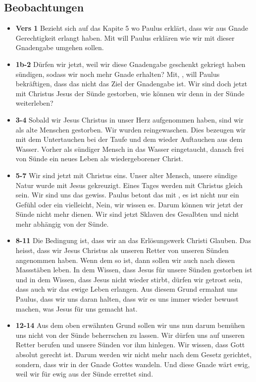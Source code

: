 \subsection{Beobachtungen}
\begin{itemize}
    \item \textbf{Vers 1} Bezieht sich auf das Kapite 5 wo Paulus erklärt, dass wir aus Gnade Gerechtigkeit erlangt haben. Mit  will Paulus erklären wie wir mit dieser Gnadengabe umgehen sollen.
    \item \textbf{1b-2} Dürfen wir jetzt, weil wir diese Gnadengabe geschenkt gekriegt haben sündigen, sodass wir noch mehr Gnade erhalten? Mit, , will Paulus bekräftigen, dass das nicht das Ziel der Gnadengabe ist. Wir sind doch jetzt mit Christus Jesus der Sünde gestorben, wie können wir denn in der Sünde weiterleben?
    \item \textbf{3-4} Sobald wir Jesus Christus in unser Herz aufgenommen haben, sind wir als alte Menschen gestorben. Wir wurden reingewaschen. Dies bezeugen wir mit dem Untertauchen bei der Taufe und dem wieder Auftauchen aus dem Wasser. Vorher als sündiger Mensch in das Wasser eingetaucht, danach frei von Sünde ein neues Leben als wiedergeborener Christ.
    \item \textbf{5-7} Wir sind jetzt mit Christus eins. Unser alter Mensch, unsere sündige Natur wurde mit Jesus gekreuzigt. Eines Tages werden mit Christus gleich sein. Wir sind uns das gewiss. Paulus betont das mit , es ist nicht nur ein Gefühl oder ein vielleicht, Nein, wir wissen es. Darum können wir jetzt der Sünde nicht mehr dienen. Wir sind jetzt Sklaven des Gesalbten und nicht mehr abhängig von der Sünde.
    \item \textbf{8-11} Die Bedingung ist, dass wir an das Erlösungswerk Christi Glauben. Das heisst, dass wir Jesus Christus als unseren Retter von unseren Sünden angenommen haben. Wenn dem so ist, dann sollen wir auch nach diesen Massstäben leben. In dem Wissen, dass Jesus für unsere Sünden gestorben ist und in dem Wissen, dass Jesus nicht wieder stirbt, dürfen wir getrost sein, dass auch wir das ewige Leben erlangen. Aus diesem Grund ermahnt uns Paulus, dass wir uns daran halten, dass wir es uns immer wieder bewusst machen, was Jesus für uns gemacht hat.
    \item \textbf{12-14} Aus dem oben erwähnten Grund sollen wir uns nun darum bemühen uns nicht von der Sünde beherrschen zu lassen. Wir dürfen uns auf unseren Retter berufen und unsere Sünden vor ihm hinlegen. Wir wissen, dass Gott absolut gerecht ist. Darum werden wir nicht mehr nach dem Gesetz gerichtet, sondern, dass wir in der Gnade Gottes wandeln. Und diese Gnade wärt ewig, weil wir für ewig aus der Sünde errettet sind.

\end{itemize}
